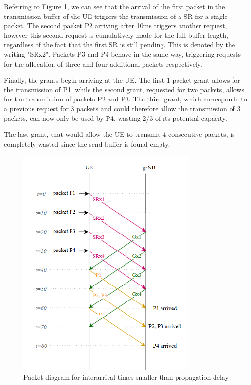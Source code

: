 Referring to Figure \ref{fig:inflated-bsr-diag}, we can see that the arrival of the first packet in the transmission buffer of the \ac{UE} triggers the transmission of a \ac{SR} for a single packet. The second packet P2 arriving after 10ms triggers another request, however this second request is cumulatively made for the full buffer length, regardless of the fact that the first \ac{SR} is still pending. This is denoted by the writing "SRx2". Packets P3 and P4 behave in the same way, triggering requests for the allocation of three and four additional packets respectively.

Finally, the grants begin arriving at the \ac{UE}. The first 1-packet grant allows for the transmission of P1, while the second grant, requested for two packets, allows for the transmission of packets P2 and P3. The third grant, which corresponds to a previous request for 3 packets and could therefore allow the transmission of 3 packets, can now only be used by P4, wasting 2/3 of its potential capacity. 

The last grant, that would allow the \ac{UE} to transmit 4 consecutive packets, is completely wasted since the send buffer is found empty.

\begin{figure}[ht]
    \centering
    \includegraphics[width=0.8\textwidth]{res/diagram-inflated-bsr.png}
    \caption{Packet diagram for interarrival times smaller than propagation delay}
    \label{fig:inflated-bsr-diag}
\end{figure}

